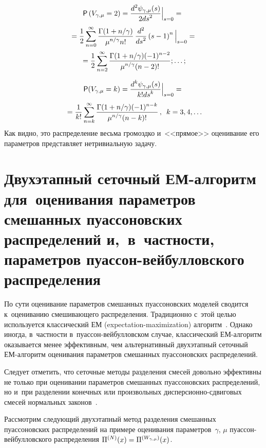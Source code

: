\begin{multicols}{2}
\vspace*{-12pt}

\begin{multline*}
{\sf P}\left(V_{\gamma,\mu}=2\right)=
\displaystyle\frac{\displaystyle d^2\psi_{\gamma,\mu}(s)\mathstrut}{\displaystyle 2ds^2\mathstrut}\Big|_{s=0}={}\\[1pt]
{}=
\displaystyle\frac{\displaystyle 1\mathstrut}{\displaystyle 2\mathstrut}\sum\limits_{n=0}^{\infty}\displaystyle\frac{\displaystyle \Gamma(1+{n}/{\gamma})\mathstrut}{\displaystyle \mu^{n/\gamma}n!\mathstrut}\,\displaystyle\frac{\displaystyle d^2\mathstrut}{\displaystyle ds^2\mathstrut}\left(s-1\right)^n\Big|_{s=0}={}\\[1pt]
{}=
\displaystyle\frac{\displaystyle 1\mathstrut}{\displaystyle 2\mathstrut}\sum\limits_{n=2}^{\infty}\displaystyle\frac{\displaystyle \Gamma(1+{n}/{\gamma})(-1)^{n-2}\mathstrut}{\displaystyle \mu^{n/\gamma}(n-2)!\mathstrut};\ldots;
\end{multline*}

\vspace*{-12pt}

\begin{multline*}
{\sf P}(V_{\gamma,\mu}=k)=\displaystyle\frac{\displaystyle d^k\psi_{\gamma,\mu}(s)\mathstrut}{\displaystyle k!ds^k\mathstrut}\Big|_{s=0}={}\\[1pt]
{}=
\displaystyle\frac{\displaystyle 1\mathstrut}{\displaystyle k!\mathstrut}\sum\limits_{n=k}^{\infty}\displaystyle\frac{\displaystyle \Gamma(1+{n}/{\gamma})(-1)^{n-k}\mathstrut}{\displaystyle \mu^{n/\gamma}(n-k)!\mathstrut}\,,\enskip k=3,4,\ldots
\end{multline*}
Как видно, это распределение весьма громоздко и~<<прямое>>
оценивание его параметров представляет нетривиальную задачу.

\section{Двухэтапный сеточный ЕМ-алгоритм для~оценивания параметров 
смешанных пуассоновских
распределений и,~в~частности, параметров пуассон-вейбулловского
рас\-пре\-де\-ле\-ния}

По сути оценивание параметров смешанных пуассоновских моделей
сводится к~оцениванию смешивающего распределения. Традиционно с~этой
целью используется классический ЕМ (expectation-maximization) ал\-го\-ритм~\cite{Karlis2005}.
Однако иногда, в~част\-ности в~пуас\-сон-вей\-бул\-лов\-ском \mbox{случае},
классический ЕМ-ал\-го\-ритм оказывается менее эффективным, чем
альтернативный двухэтапный сеточный ЕМ-ал\-го\-ритм оценивания
параметров смешанных пуассоновских распределений.

Следует отметить, что сеточные методы разделения смесей довольно
эффективны не только при оценивании параметров смешанных
пуассоновских распределений, но и~при разделении конечных или
произвольных дис\-пер\-си\-он\-но-сдви\-го\-вых смесей нормальных 
законов~\cite{KorolevKorchagin2014}.

Рассмотрим следующий двухэтапный метод разделения смешанных
пуассоновских распределений на примере оценивания параметров~$\gamma$, 
$\mu$ пу\-ас\-сон-вей\-бул\-лов\-ско\-го распределения
$\Pi^{(N)}(x)\hm=\Pi^{(W_{\gamma,\mu})}(x)$.


\end{multicols}
